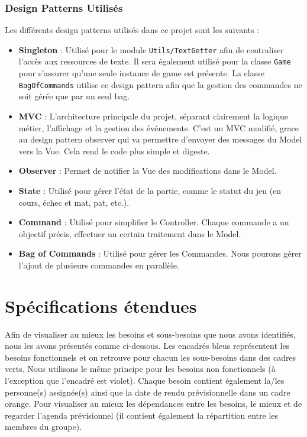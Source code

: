 \documentclass{article}
\begin{document}
\subsubsection{Design Patterns Utilisés}

Les différents design patterns utilisés dans ce projet sont les suivants : 
\begin{itemize}
    \item \textbf{Singleton} : Utilisé pour le module \texttt{Utils/TextGetter} afin de centraliser l'accès aux ressources de texte. Il sera également utilisé pour
la classe \texttt{Game} pour s'assurer qu'une seule instance de game est présente. La classe \texttt{BagOfCommands} utilise ce design pattern afin que la gestion des commandes
ne soit gérée que par un seul bag.
    \item \textbf{MVC} : L'architecture principale du projet, séparant clairement la logique métier, l'affichage et la gestion des événements. C'est un MVC modifié,
 grace au design pattern observer qui va permettre d'envoyer des messages du Model vers la Vue. Cela rend le code plus simple et digeste.
    \item \textbf{Observer} : Permet de notifier la Vue des modifications dans le Model.
    \item \textbf{State} : Utilisé pour gérer l'état de la partie, comme le statut du jeu (en cours, échec et mat, pat, etc.).
    \item \textbf{Command} : Utilisé pour simplifier le Controller. Chaque commande a un objectif précis, effectuer un certain traitement dans le Model.
    \item \textbf{Bag of Commands} : Utilisé pour gérer les Commandes. Nous pourons gérer l'ajout de plusieurs commandes en parallèle.
\end{itemize}


\section{Spécifications étendues}
\label{Spec}

Afin de visualiser au mieux les besoins et sous-besoins que nous avons identifiés, nous les avons présentés comme ci-dessous.
Les encadrés bleus représentent les besoins fonctionnels et on retrouve pour chacun les sous-besoins dans des cadres verts.
Nous utilisons le même principe pour les besoins non fonctionnels (à l'exception que l'encadré est violet). Chaque besoin
contient également la/les personne(s) assignée(s) ainsi que la date de rendu prévisionnelle dans un cadre orange. Pour visualiser
au mieux les dépendances entre les besoins, le mieux et de regarder l'agenda prévisionnel (il contient également la répartition
entre les membres du groupe).
\end{document}
